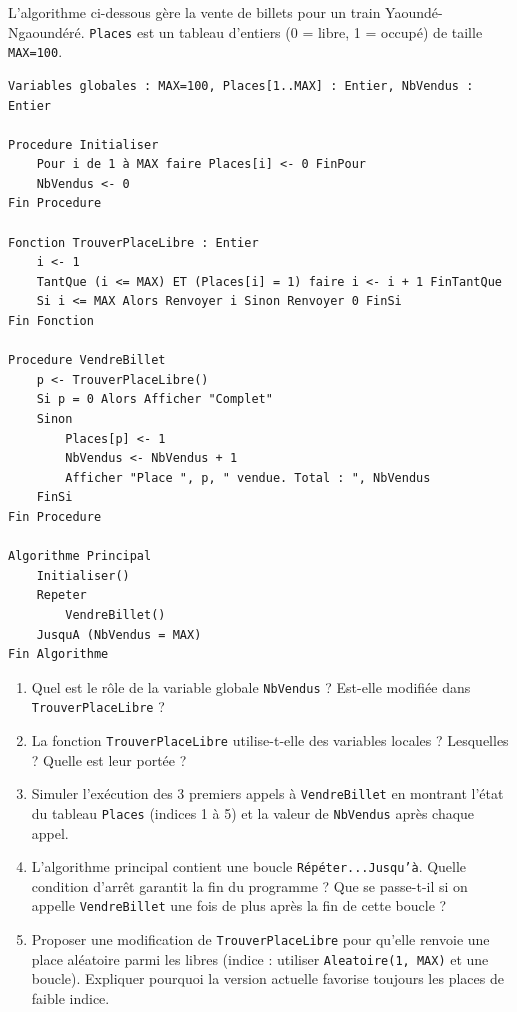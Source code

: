 \documentclass[11pt]{article}
\begin{document}
\begin{exercice}
L'algorithme ci-dessous gère la vente de billets pour un train Yaoundé-Ngaoundéré. \texttt{Places} est un tableau d'entiers (0 = libre, 1 = occupé) de taille \texttt{MAX=100}.
\begin{verbatim}
Variables globales : MAX=100, Places[1..MAX] : Entier, NbVendus : Entier

Procedure Initialiser
    Pour i de 1 à MAX faire Places[i] <- 0 FinPour
    NbVendus <- 0
Fin Procedure

Fonction TrouverPlaceLibre : Entier
    i <- 1
    TantQue (i <= MAX) ET (Places[i] = 1) faire i <- i + 1 FinTantQue
    Si i <= MAX Alors Renvoyer i Sinon Renvoyer 0 FinSi
Fin Fonction

Procedure VendreBillet
    p <- TrouverPlaceLibre()
    Si p = 0 Alors Afficher "Complet"
    Sinon
        Places[p] <- 1
        NbVendus <- NbVendus + 1
        Afficher "Place ", p, " vendue. Total : ", NbVendus
    FinSi
Fin Procedure

Algorithme Principal
    Initialiser()
    Repeter
        VendreBillet()
    JusquA (NbVendus = MAX)
Fin Algorithme
\end{verbatim}
\begin{enumerate}
    \item Quel est le rôle de la variable globale \texttt{NbVendus} ? Est-elle modifiée dans \texttt{TrouverPlaceLibre} ?
    \item La fonction \texttt{TrouverPlaceLibre} utilise-t-elle des variables locales ? Lesquelles ? Quelle est leur portée ?
    \item Simuler l'exécution des 3 premiers appels à \texttt{VendreBillet} en montrant l'état du tableau \texttt{Places} (indices 1 à 5) et la valeur de \texttt{NbVendus} après chaque appel.
    \item L'algorithme principal contient une boucle \texttt{Répéter...Jusqu'à}. Quelle condition d'arrêt garantit la fin du programme ? Que se passe-t-il si on appelle \texttt{VendreBillet} une fois de plus après la fin de cette boucle ?
    \item Proposer une modification de \texttt{TrouverPlaceLibre} pour qu'elle renvoie une place aléatoire parmi les libres (indice : utiliser \texttt{Aleatoire(1, MAX)} et une boucle). Expliquer pourquoi la version actuelle favorise toujours les places de faible indice.
\end{enumerate}
\end{exercice}
\end{document}

